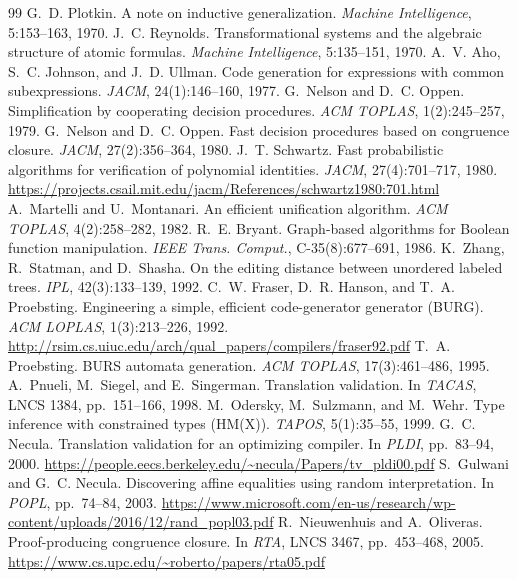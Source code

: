 \documentclass[11pt,a4paper]{article}
\begin{document}
\begin{thebibliography}{99}
 G.~D. Plotkin. A note on inductive generalization. \emph{Machine Intelligence}, 5:153--163, 1970.
 J.~C. Reynolds. Transformational systems and the algebraic structure of atomic formulas. \emph{Machine Intelligence}, 5:135--151, 1970.
 A.~V. Aho, S.~C. Johnson, and J.~D. Ullman. Code generation for expressions with common subexpressions. \emph{JACM}, 24(1):146--160, 1977.
 G.~Nelson and D.~C. Oppen. Simplification by cooperating decision procedures. \emph{ACM TOPLAS}, 1(2):245--257, 1979.
 G.~Nelson and D.~C. Oppen. Fast decision procedures based on congruence closure. \emph{JACM}, 27(2):356--364, 1980.
 J.~T. Schwartz. Fast probabilistic algorithms for verification of polynomial identities. \emph{JACM}, 27(4):701--717, 1980. \url{https://projects.csail.mit.edu/jacm/References/schwartz1980:701.html}
 A.~Martelli and U.~Montanari. An efficient unification algorithm. \emph{ACM TOPLAS}, 4(2):258--282, 1982.
 R.~E. Bryant. Graph-based algorithms for Boolean function manipulation. \emph{IEEE Trans. Comput.}, C-35(8):677--691, 1986.
 K.~Zhang, R.~Statman, and D.~Shasha. On the editing distance between unordered labeled trees. \emph{IPL}, 42(3):133--139, 1992.
 C.~W. Fraser, D.~R. Hanson, and T.~A. Proebsting. Engineering a simple, efficient code-generator generator (BURG). \emph{ACM LOPLAS}, 1(3):213--226, 1992. \url{http://rsim.cs.uiuc.edu/arch/qual_papers/compilers/fraser92.pdf}
 T.~A. Proebsting. BURS automata generation. \emph{ACM TOPLAS}, 17(3):461--486, 1995.
 A.~Pnueli, M.~Siegel, and E.~Singerman. Translation validation. In \emph{TACAS}, LNCS 1384, pp.~151--166, 1998.
 M.~Odersky, M.~Sulzmann, and M.~Wehr. Type inference with constrained types (HM(X)). \emph{TAPOS}, 5(1):35--55, 1999.
 G.~C. Necula. Translation validation for an optimizing compiler. In \emph{PLDI}, pp.~83--94, 2000. \url{https://people.eecs.berkeley.edu/~necula/Papers/tv_pldi00.pdf}
 S.~Gulwani and G.~C. Necula. Discovering affine equalities using random interpretation. In \emph{POPL}, pp.~74--84, 2003. \url{https://www.microsoft.com/en-us/research/wp-content/uploads/2016/12/rand_popl03.pdf}
 R.~Nieuwenhuis and A.~Oliveras. Proof-producing congruence closure. In \emph{RTA}, LNCS 3467, pp.~453--468, 2005. \url{https://www.cs.upc.edu/~roberto/papers/rta05.pdf}

\end{thebibliography}
\end{document}

